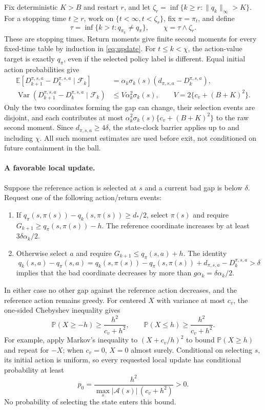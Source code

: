 Fix deterministic $K>B$ and restart $r$, and let $\zeta_r=\inf\{k\ge r:\|q_k\|_\infty>K\}$. For a
stopping time $t\ge r$, work on $\{t<\infty,t<\zeta_r\}$, fix $\pi=\pi_t$, and define
\begin{equation}\label{eq:stops}
\tau=\inf\{k>t:q_{\pi_k}\ne q_\pi\},\qquad \chi=\tau\wedge\zeta_r.
\end{equation}
These are stopping times. Return moments give finite second moments for every fixed-time
table by induction in \eqref{eq:update}. For $t\le k<\chi$, the action-value target is exactly $q_\pi$, even if the
selected policy label is different. Equal initial action probabilities give
\begin{align}
\mathbb E[D_{k+1}^{\pi,s,a}-D_k^{\pi,s,a}\mid\mathcal F_k]
&=\alpha_k\sigma_k(s)(d_{\pi,s,a}-D_k^{\pi,s,a}),\label{eq:gapdrift}\\
\operatorname{Var}(D_{k+1}^{\pi,s,a}-D_k^{\pi,s,a}\mid\mathcal F_k)
&\le V\alpha_k^2\sigma_k(s),\qquad V=2\{c_v+(B+K)^2\}.\label{eq:gapvariance}
\end{align}
Only the two coordinates forming the gap can change, their selection events are disjoint,
and each contributes at most $\alpha_k^2\sigma_k(s)\{c_v+(B+K)^2\}$ to the raw second moment. Since
$d_{\pi,s,a}\ge4\delta$, the state-clock barrier applies up to and including $\chi$. All such moment estimates
are used before exit, not conditioned on future containment in the ball.

\paragraph{A favorable local update.}
Suppose the reference action is selected at $s$ and a current
bad gap is below $\delta$. Request one of the following action/return events:
\begin{enumerate}
\item If $q_\pi(s,\pi(s))-q_k(s,\pi(s))\ge d_*/2$, select $\pi(s)$ and require $G_{k+1}\ge q_\pi(s,\pi(s))-h$. The
reference coordinate increases by at least $3\delta\alpha_k/2$.
\item Otherwise select $a$ and require $G_{k+1}\le q_\pi(s,a)+h$. The identity
\[
q_k(s,a)-q_\pi(s,a)=q_k(s,\pi(s))-q_\pi(s,\pi(s))+d_{\pi,s,a}-D_k^{\pi,s,a}>\delta
\]
implies that the bad coordinate decreases by more than $g\alpha_k=\delta\alpha_k/2$.
\end{enumerate}
In either case no other gap against the reference action decreases, and the reference action
remains greedy. For centered $X$ with variance at most $c_v$, the one-sided Chebyshev inequality
gives
\[
\mathbb P(X\ge-h)\ge\frac{h^2}{c_v+h^2},\qquad
\mathbb P(X\le h)\ge\frac{h^2}{c_v+h^2}.
\]
For example, apply Markov's inequality to $(X+c_v/h)^2$ to bound $\mathbb P(X\ge h)$ and repeat for
$-X$; when $c_v=0$, $X=0$ almost surely. Conditional on selecting $s$, its initial action is
uniform, so every requested local update has conditional probability at least
\begin{equation}\label{eq:localprob}
p_0=\frac{h^2}{\max_s|\mathcal A(s)|\,(c_v+h^2)}>0.
\end{equation}
No probability of selecting the state enters this bound.

